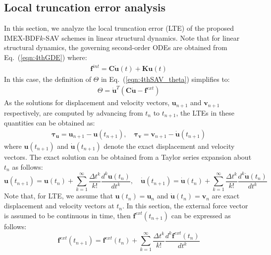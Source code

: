 \documentclass[review]{elsarticle}
\begin{document}
\subsection{Local truncation error analysis}
\label{subsec:4th23}
In this section, we analyze the local truncation error (LTE) of the proposed IMEX-BDF$k$-SAV schemes in linear structural dynamics.
Note that for linear structural dynamics, the governing second-order ODEs are obtained from Eq.~(\ref{eqn:4thGDE})  where:
\begin{align}
    \boldsymbol{f}^{int} = \boldsymbol{C}\dot{\boldsymbol{u}}(t)  + \boldsymbol{K}\boldsymbol{u}(t) 
    \label{eqn:4thEOMLinHomo}
\end{align}
In this case, the definition of $\Theta$ in Eq.~(\ref{eqn:4thSAV_theta}) simplifies to:
 \begin{align}
     \Theta=\dot{\boldsymbol{u}}^T (\boldsymbol{C}\dot{\boldsymbol{u}} -  \boldsymbol{f}^{ext})
     \label{eqn:4thSAV_thetaL}
 \end{align}
As the solutions for displacement and velocity vectors, $\boldsymbol{u}_{n+1}$ and $\boldsymbol{v}_{n+1}$ respectively, are computed by advancing from $t_n$ to $t_{n+1}$, the LTEs in these quantities can be obtained as:
\begin{align} 
    \boldsymbol{\tau}_{\boldsymbol{u}} = \boldsymbol{u}_{n+1}-\boldsymbol{u}(t_{n+1}), \quad
   \boldsymbol{\tau}_{\boldsymbol{v}} = \boldsymbol{v}_{n+1}-\dot{\boldsymbol{u}}(t_{n+1})
\end{align}
where ${\boldsymbol{u}}(t_{n+1})$ and $\dot{\boldsymbol{u}}(t_{n+1})$ denote the exact displacement and velocity vectors.
The exact solution can be obtained from a Taylor series expansion about $t_n$ as follows:
\begin{equation}
    \boldsymbol{u}(t_{n+1}) = \boldsymbol{u}(t_n) + \sum_{k=1}^{\infty}\frac{\Delta t^k}{k!}\frac{d^k\boldsymbol{u}(t_n)}{dt^k}, \quad
    \dot{\boldsymbol{u}}(t_{n+1}) = \dot{\boldsymbol{u}}(t_{n}) + \sum_{k=1}^{\infty}\frac{\Delta t^k}{k!}\frac{d^{k}\dot{\boldsymbol{u}}(t_n)}{dt^{k}}
    \label{eqn:4thTaylor}
\end{equation}
Note that, for LTE, we assume that $\boldsymbol{u}(t_n)=\boldsymbol{u}_n$ and $\dot{\boldsymbol{u}}(t_n)=\boldsymbol{v}_n$ are exact displacement and velocity vectors at $t_n$.
In this section, the external force vector is assumed to be continuous in time, then $\boldsymbol{f}^{ext}(t_{n+1})$ can be expressed as follows:
\begin{equation}
    \boldsymbol{f}^{ext}(t_{n+1}) = \boldsymbol{f}^{ext}(t_n) + \sum_{k=1}^{\infty}\frac{\Delta t^k}{k!}\frac{d^k\boldsymbol{f}^{ext}(t_n)}{dt^k}
    \label{eqn:4thTaylorForce}
\end{equation}
\end{document}
